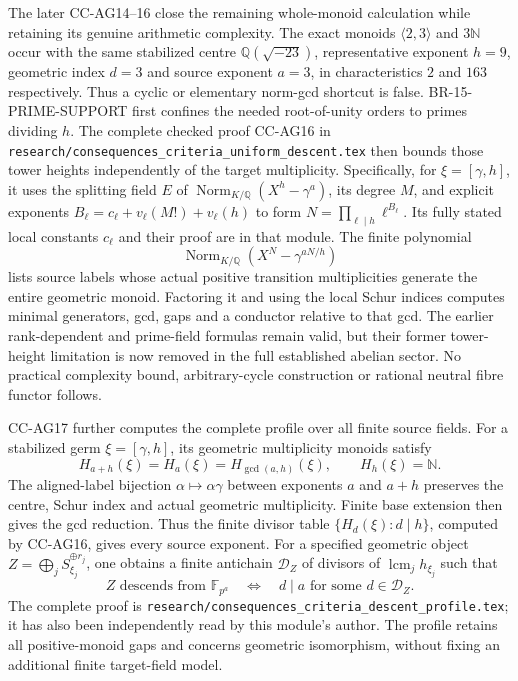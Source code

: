 The later CC-AG14--16 close the remaining whole-monoid
calculation while retaining its genuine arithmetic complexity.
The exact monoids $\langle2,3\rangle$ and $3\mathbb N$ occur
with the same stabilized centre $\mathbb Q(\sqrt{-23})$,
representative exponent $h=9$, geometric index $d=3$ and
source exponent $a=3$, in characteristics $2$ and $163$
respectively. Thus a cyclic or elementary norm-gcd shortcut
is false. BR-15-PRIME-SUPPORT first confines the needed
root-of-unity orders to primes dividing $h$. The complete
checked proof CC-AG16 in
\texttt{research/consequences\_criteria\_uniform\_descent.tex}
then bounds those tower heights independently of the target
multiplicity. Specifically, for $\xi=[\gamma,h]$, it uses
the splitting field $E$ of $\operatorname{Norm}_{K/\mathbb Q}
(X^h-\gamma^a)$, its degree $M$, and explicit exponents
$B_\ell=c_\ell+v_\ell(M!)+v_\ell(h)$ to form
$N=\prod_{\ell\mid h}\ell^{B_\ell}$. Its fully stated
local constants $c_\ell$ and their proof are in that module.
The finite polynomial
\[
       \operatorname{Norm}_{K/\mathbb Q}
                  (X^N-\gamma^{aN/h})
\]
lists source labels whose actual positive transition
multiplicities generate the entire geometric monoid.
Factoring it and using the local Schur indices computes
minimal generators, gcd, gaps and a conductor relative to
that gcd. The earlier rank-dependent and prime-field
formulas remain valid, but their former tower-height
limitation is now removed in the full established abelian
sector. No practical complexity bound, arbitrary-cycle
construction or rational neutral fibre functor follows.

CC-AG17 further computes the complete profile over all
finite source fields.  For a stabilized germ $\xi=[\gamma,h]$,
its geometric multiplicity monoids satisfy
\[
 H_{a+h}(\xi)=H_a(\xi)=H_{\gcd(a,h)}(\xi),
                   \qquad H_h(\xi)=\mathbb N.
\]
The aligned-label bijection $\alpha\mapsto\alpha\gamma$
between exponents $a$ and $a+h$ preserves the centre,
Schur index and actual geometric multiplicity.  Finite
base extension then gives the gcd reduction.  Thus the
finite divisor table $\{H_d(\xi):d\mid h\}$, computed by
CC-AG16, gives every source exponent.  For a specified
geometric object $Z=\bigoplus_jS_{\xi_j}^{\oplus r_j}$,
one obtains a finite antichain $\mathcal D_Z$ of divisors
of $\operatorname{lcm}_j h_{\xi_j}$ such that
\[
 Z\text{ descends from }\mathbb F_{p^a}
 \quad\Longleftrightarrow\quad
           d\mid a\text{ for some }d\in\mathcal D_Z.
\]
The complete proof is
\texttt{research/consequences\_criteria\_descent\_profile.tex};
it has also been independently read by this module's author.
The profile retains all positive-monoid gaps and concerns
geometric isomorphism, without fixing an additional finite
target-field model.

